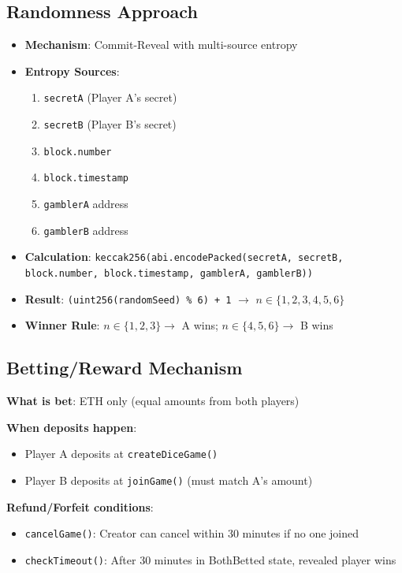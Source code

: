 \documentclass[10pt,a4paper]{article}
\begin{document}
\subsection*{Randomness Approach}
\begin{itemize}
    \item \textbf{Mechanism}: Commit-Reveal with multi-source entropy
    \item \textbf{Entropy Sources}:
    \begin{enumerate}
        \item \texttt{secretA} (Player A's secret)
        \item \texttt{secretB} (Player B's secret)
        \item \texttt{block.number}
        \item \texttt{block.timestamp}
        \item \texttt{gamblerA} address
        \item \texttt{gamblerB} address
    \end{enumerate}
    \item \textbf{Calculation}: \texttt{keccak256(abi.encodePacked(secretA, secretB, block.number, block.timestamp, gamblerA, gamblerB))}
    \item \textbf{Result}: \texttt{(uint256(randomSeed) \% 6) + 1} $\to$ $n \in \{1,2,3,4,5,6\}$
    \item \textbf{Winner Rule}: $n \in \{1,2,3\} \to$ A wins; $n \in \{4,5,6\} \to$ B wins
\end{itemize}

\subsection*{Betting/Reward Mechanism}

\textbf{What is bet}: ETH only (equal amounts from both players)

\textbf{When deposits happen}:
\begin{itemize}
    \item Player A deposits at \texttt{createDiceGame()}
    \item Player B deposits at \texttt{joinGame()} (must match A's amount)
\end{itemize}

\textbf{Refund/Forfeit conditions}:
\begin{itemize}
    \item \texttt{cancelGame()}: Creator can cancel within 30 minutes if no one joined
    \item \texttt{checkTimeout()}: After 30 minutes in BothBetted state, revealed player wins
\end{itemize}
\end{document}
